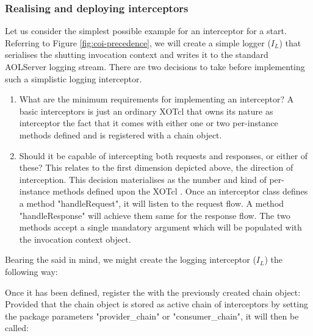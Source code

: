 \subsubsection{Realising and deploying interceptors}  
Let us consider the simplest possible example for an interceptor for a start. Referring to Figure \ref{fig:coi-precedence}, we will create a simple logger (\begin{math}I_L\end{math}) that serialises the shutting invocation context and writes it to the standard AOLServer logging stream. There are two decisions to take before implementing such a simplistic logging interceptor.
\begin{enumerate}
\item What are the minimum requirements for implementing an interceptor? A basic interceptors is just an ordinary XOTcl  that owns its nature as interceptor the fact that it comes with either one or two per-instance methods defined and is registered with a chain object.
\item Should it be capable of intercepting both requests and responses, or either of these? This relates to the first dimension depicted above, the direction of interception. This decision materialises as the number and kind of per-instance methods defined upon the XOTcl . Once an interceptor class defines a method "handleRequest", it will listen to the request flow. A method "handleResponse" will achieve them same for the response flow. The two methods accept a single mandatory argument which will be populated with the invocation context object.
\end{enumerate}
Bearing the said in mind, we might create the logging interceptor (\begin{math}I_L\end{math}) the following way:
\lstset{breaklines=true,numbers=left,basicstyle=\footnotesize,frame=single}

Once it has been defined, register the  with the previously created chain object:
Provided that the chain object is stored as active chain of interceptors by setting the package parameters "provider\_chain" or "consumer\_chain", it will then be called:
%
\lstset{breaklines=true,numbers=left,basicstyle=\footnotesize,frame=single}

